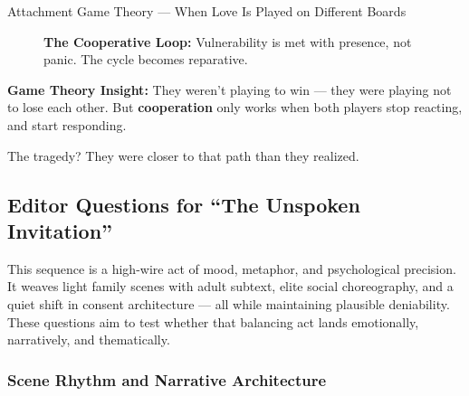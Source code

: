 \begin{TechnicalSidebar}{Attachment Game Theory — When Love Is Played on Different Boards}
\begin{figure}[H]
  \caption*{\textbf{The Cooperative Loop:} Vulnerability is met with presence, not panic. The cycle 
  becomes reparative.}
  \end{figure}

  \medskip

  \noindent\textbf{Game Theory Insight:}  
  They weren’t playing to win — they were playing not to lose each other.  
  But \textbf{cooperation} only works when both players stop reacting, and start responding.

  \medskip

  The tragedy? They were closer to that path than they realized.

\end{TechnicalSidebar}



\subsection*{Editor Questions for ``The Unspoken Invitation''}

This sequence is a high-wire act of mood, metaphor, and psychological precision. It weaves light family scenes with adult subtext, elite social choreography, and a quiet shift in consent architecture — all while maintaining plausible deniability. These questions aim to test whether that balancing act lands emotionally, narratively, and thematically.

\subsubsection*{Scene Rhythm and Narrative Architecture}

